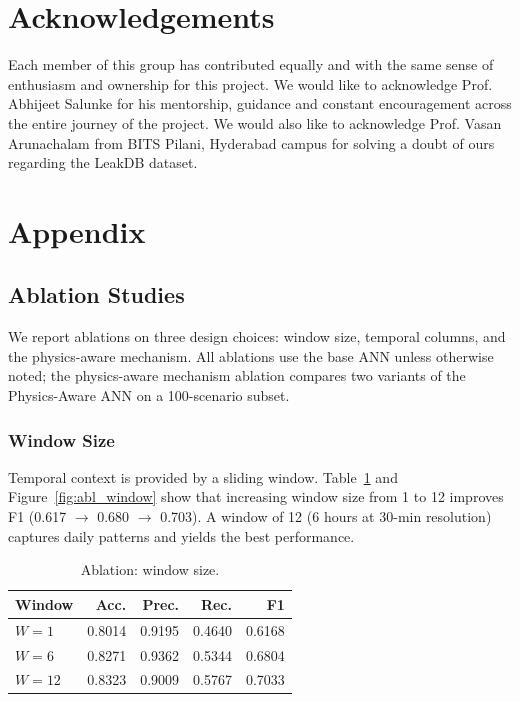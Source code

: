 \documentclass[final,5p,times,twocolumn,authoryear]{elsarticle}
\begin{document}
\section{Acknowledgements}
Each member of this group has contributed equally and with the same sense of enthusiasm and ownership for this project.
\newline We would like to acknowledge Prof. Abhijeet Salunke for his mentorship, guidance and constant encouragement across the entire journey of the project.
\newline We would also like to acknowledge Prof. Vasan Arunachalam from BITS Pilani, Hyderabad campus for solving a doubt of ours regarding the LeakDB dataset.
\section{Appendix}

\subsection{Ablation Studies}

We report ablations on three design choices: window size, temporal columns, and the physics-aware mechanism. All ablations use the base ANN unless otherwise noted; the physics-aware mechanism ablation compares two variants of the Physics-Aware ANN on a 100-scenario subset.

\subsubsection{Window Size}

Temporal context is provided by a sliding window. Table~\ref{tab:abl_window} and Figure~\ref{fig:abl_window} show that increasing window size from 1 to 12 improves F1 (0.617 $\rightarrow$ 0.680 $\rightarrow$ 0.703). A window of 12 (6 hours at 30-min resolution) captures daily patterns and yields the best performance.

\begin{table}[H]
\centering
\caption{Ablation: window size.}
\label{tab:abl_window}
\small
\begin{tabular}{@{}lrrrr@{}}
\toprule
\textbf{Window} & \textbf{Acc.} & \textbf{Prec.} & \textbf{Rec.} & \textbf{F1} \\ \midrule
$W=1$  & 0.8014 & 0.9195 & 0.4640 & 0.6168 \\
$W=6$  & 0.8271 & 0.9362 & 0.5344 & 0.6804 \\
$W=12$ & 0.8323 & 0.9009 & 0.5767 & 0.7033 \\ \bottomrule
\end{tabular}
\end{table}
\end{document}
